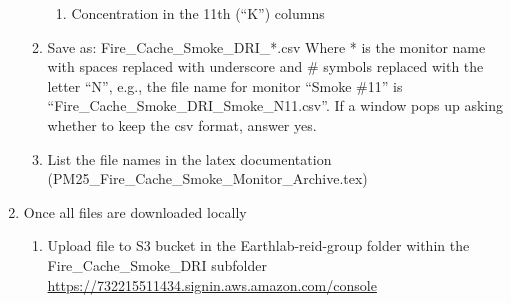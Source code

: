 \begin{enumerate}
\begin{enumerate}[nolistsep]
\begin{enumerate}[nolistsep]
\item Concentration in the 11th (``K”) columns
\end{enumerate}
\item Save as: Fire\_Cache\_Smoke\_DRI\_*.csv Where * is the monitor name with spaces replaced with underscore and \# symbols replaced with the letter ``N'', e.g., the file name for monitor “Smoke \#11” is “Fire\_Cache\_Smoke\_DRI\_Smoke\_N11.csv”. If a window pops up asking whether to keep the csv format, answer yes.
\item List the file names in the latex documentation (PM25\_Fire\_Cache\_Smoke\_Monitor\_Archive.tex)
\end{enumerate}

\item Once all files are downloaded locally

\begin{enumerate}[nolistsep]
\item Upload file to S3 bucket in the Earthlab-reid-group folder within the Fire\_Cache\_Smoke\_DRI subfolder \url{https://732215511434.signin.aws.amazon.com/console}

\end{enumerate}

\end{enumerate}


